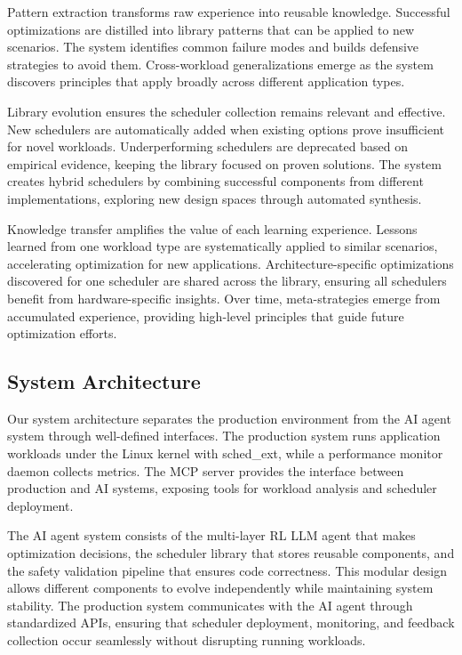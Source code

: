 Pattern extraction transforms raw experience into reusable knowledge. Successful optimizations are distilled into library patterns that can be applied to new scenarios. The system identifies common failure modes and builds defensive strategies to avoid them. Cross-workload generalizations emerge as the system discovers principles that apply broadly across different application types.

Library evolution ensures the scheduler collection remains relevant and effective. New schedulers are automatically added when existing options prove insufficient for novel workloads. Underperforming schedulers are deprecated based on empirical evidence, keeping the library focused on proven solutions. The system creates hybrid schedulers by combining successful components from different implementations, exploring new design spaces through automated synthesis.

Knowledge transfer amplifies the value of each learning experience. Lessons learned from one workload type are systematically applied to similar scenarios, accelerating optimization for new applications. Architecture-specific optimizations discovered for one scheduler are shared across the library, ensuring all schedulers benefit from hardware-specific insights. Over time, meta-strategies emerge from accumulated experience, providing high-level principles that guide future optimization efforts.

\subsection{System Architecture}

Our system architecture separates the production environment from the AI agent system through well-defined interfaces. The production system runs application workloads under the Linux kernel with sched\_ext, while a performance monitor daemon collects metrics. The MCP server provides the interface between production and AI systems, exposing tools for workload analysis and scheduler deployment.

The AI agent system consists of the multi-layer RL LLM agent that makes optimization decisions, the scheduler library that stores reusable components, and the safety validation pipeline that ensures code correctness. This modular design allows different components to evolve independently while maintaining system stability. The production system communicates with the AI agent through standardized APIs, ensuring that scheduler deployment, monitoring, and feedback collection occur seamlessly without disrupting running workloads.

